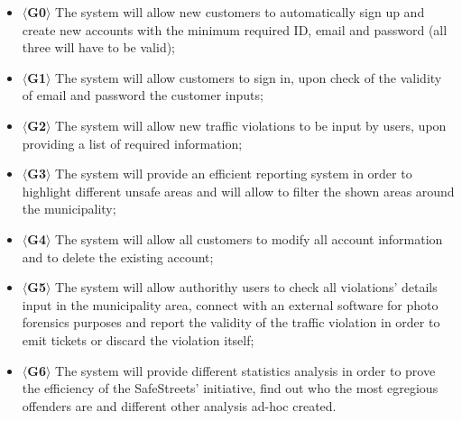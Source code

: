 \documentclass{article}
\begin{document}
    \begin{itemize}
        \item $\langle$\textbf{G0}$\rangle$ The system will allow new customers
        to automatically sign up and create new accounts with the minimum
        required ID, email and password (all three will have to be valid);
        \item $\langle$\textbf{G1}$\rangle$ The system will allow customers to
        sign in, upon check of the validity of email and password the customer
        inputs;
        \item $\langle$\textbf{G2}$\rangle$ The system will allow new traffic
        violations to be input by users, upon providing a list of required
        information;
        \item $\langle$\textbf{G3}$\rangle$ The system will provide an efficient
        reporting system in order to highlight different unsafe areas and will
        allow to filter the shown areas around the municipality; 
        \item $\langle$\textbf{G4}$\rangle$ The system will allow all customers
        to modify all account information and to delete the existing account; 
        \item $\langle$\textbf{G5}$\rangle$ The system will allow authorithy users
        to check all violations' details input in the municipality area, connect
        with an external software for photo forensics purposes and report the
        validity of the traffic violation in order to emit tickets or discard
        the violation itself;
        \item $\langle$\textbf{G6}$\rangle$ The system will provide different
        statistics analysis in order to prove the efficiency of the SafeStreets’
        initiative, find out who the most egregious offenders are and different
        other analysis ad-hoc created.
    \end{itemize}
\end{document}
